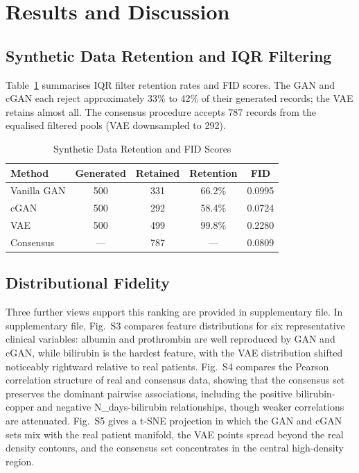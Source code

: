 \section{Results and Discussion}
\label{sec:results}

\subsection{Synthetic Data Retention and IQR Filtering}

Table~\ref{tab:retention} summarises IQR filter retention rates and FID scores. The GAN and cGAN each reject approximately 33\% to 42\% of their generated records; the VAE retains almost all. The consensus procedure accepts 787 records from the equalised filtered pools (VAE downsampled to 292).

\begin{table}[!tb]
  \centering
  \caption{Synthetic Data Retention and FID Scores}
  \label{tab:retention}
  \begin{tabular}{lcccc}
    \toprule
    Method & Generated & Retained & Retention & FID \\
    \midrule
    Vanilla GAN   & 500 & 331 & 66.2\% & 0.0995 \\
    cGAN         & 500 & 292 & 58.4\% & 0.0724 \\
    VAE          & 500 & 499 & 99.8\% & 0.2280 \\
    Consensus     & ---  & 787 & ---   & 0.0809 \\
    \bottomrule
  \end{tabular}
\end{table}

\subsection{Distributional Fidelity}


Three further views support this ranking are provided in supplementary file. In supplementary file, Fig.~S3 compares feature distributions for six representative clinical variables: albumin and prothrombin are well reproduced by GAN and cGAN, while bilirubin is the hardest feature, with the VAE distribution shifted noticeably rightward relative to real patients. Fig.~S4 compares the Pearson correlation structure of real and consensus data, showing that the consensus set preserves the dominant pairwise associations, including the positive bilirubin-copper and negative N\_days-bilirubin relationships, though weaker correlations are attenuated. Fig.~S5 gives a t-SNE projection in which the GAN and cGAN sets mix with the real patient manifold, the VAE points spread beyond the real density contours, and the consensus set concentrates in the central high-density region.

